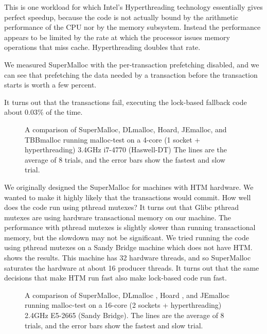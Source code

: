 \documentclass[pldi]{sigplanconf-pldi15}
\begin{document}
This is one workload for which Intel's Hyperthreading technology
essentially gives perfect speedup, because the code is not actually
bound by the arithmetic performance of the CPU nor by the memory
subsystem.  Instead the performance appears to be limited by the rate
at which the processor issues memory operations that miss cache.
Hyperthreading doubles that rate.

We measured SuperMalloc with the per-transaction
prefetching disabled, and we can see that prefetching the data needed
by a transaction before the transaction starts is worth a few percent.

It turns out that the transactions fail, executing the lock-based
fallback code about $0.03$\% of the time.

\begin{figure}

\caption{A comparison of SuperMalloc, DLmalloc, Hoard,
  JEmalloc, and TBBmalloc running malloc-test
  on a 4-core (1 socket + hyperthreading) 3.4GHz i7-4770 (Haswell-DT)
  The lines are the average of 8 trials, and the error bars
  show the fastest and slow trial.}
\label{fig:datahtm}
\vspace*{-3ex}
\end{figure}

We originally designed the SuperMalloc for machines with HTM hardware.
We wanted to make it highly likely that the transactions would commit.
How well does the code run using pthread mutexes?  It turns out that
Glibc pthread mutexes are using hardware transactional memory on our
machine.  The performance with pthread mutexes is slightly slower than
running transactional memory, but the slowdown may not be significant.
We tried running the code using pthread mutexes on a Sandy Bridge
machine which does not have HTM\@.   shows the
results. This machine has 32 hardware threads, and so SuperMalloc
saturates the hardware at about 16 producer threads.  It turns out
that the same decisions that make HTM run fast also make lock-based
code run fast.

\begin{figure}

\caption{A comparison of SuperMalloc, DLmalloc \cite{Lea96}, Hoard
  \cite{BergerMcBl00}, and JEmalloc~\cite{Evans06} running malloc-test
  on a 16-core (2 sockets + hyperthreading) 2.4GHz E5-2665 (Sandy
  Bridge).  The lines are the average of 8 trials, and the error bars
  show the fastest and slow trial.}
\label{fig:datalock}
\vspace*{-3ex}
\end{figure}
\end{document}
